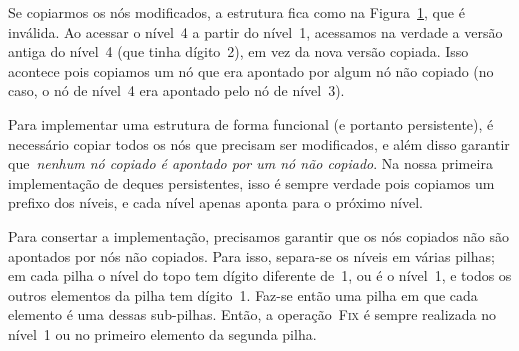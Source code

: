 \documentclass[../../main.tex]{subfiles}
\begin{document}
\begin{figure}
\centering
{}
\caption{} \label{fig:func_ex1res}
\end{figure}

Se copiarmos os nós modificados, a estrutura fica como na Figura~\ref{fig:func_ex1res}, que é inválida. Ao acessar o nível~4 a partir do nível~1, acessamos na verdade a versão antiga do nível~4 (que tinha dígito~2), em vez da nova versão copiada. Isso acontece pois copiamos um nó que era apontado por algum nó não copiado (no caso, o nó de nível~4 era apontado pelo nó de nível~3).

Para implementar uma estrutura de forma funcional (e portanto persistente), é necessário copiar todos os nós que precisam ser modificados, e além disso garantir que~\emph{nenhum nó copiado é apontado por um nó não copiado}. Na nossa primeira implementação de deques persistentes, isso é sempre verdade pois copiamos um prefixo dos níveis, e cada nível apenas aponta para o próximo nível.

Para consertar a implementação, precisamos garantir que os nós copiados não são apontados por nós não copiados. Para isso, separa-se os níveis em várias pilhas; em cada pilha o nível do topo tem dígito diferente de~1, ou é o nível~1, e todos os outros elementos da pilha tem dígito~1. Faz-se então uma pilha em que cada elemento é uma dessas sub-pilhas. Então, a operação~\textsc{Fix} é sempre realizada no nível~1 ou no primeiro elemento da segunda pilha.
\end{document}
